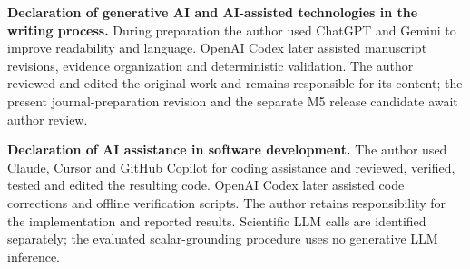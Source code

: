 \documentclass[pdflatex,iicol,sn-basic,Numbered]{sn-jnl}
\begin{document}
\noindent\textbf{Declaration of generative AI and AI-assisted technologies in the writing process.} During preparation the author used ChatGPT and Gemini to improve readability and language. OpenAI Codex later assisted manuscript revisions, evidence organization and deterministic validation. The author reviewed and edited the original work and remains responsible for its content; the present journal-preparation revision and the separate M5 release candidate await author review.

\noindent\textbf{Declaration of AI assistance in software development.} The author used Claude, Cursor and GitHub Copilot for coding assistance and reviewed, verified, tested and edited the resulting code. OpenAI Codex later assisted code corrections and offline verification scripts. The author retains responsibility for the implementation and reported results. Scientific LLM calls are identified separately; the evaluated scalar-grounding procedure uses no generative LLM inference.


\end{document}
